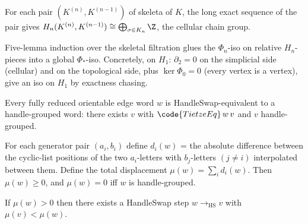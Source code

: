 \begin{lemma}
\label{lem:r3subB-A-r2}
For each pair \((K^{(n)},K^{(n-1)})\) of skeleta of \(K\),
the long exact sequence of the pair gives
\(H_{n}(K^{(n)},K^{(n-1)})\cong\bigoplus_{\sigma\in K_{n}}\Z\),
the cellular chain group.
\leanok
\end{lemma}

\begin{lemma}
\label{lem:r3subB-A-r3}
Five-lemma induction over the skeletal filtration glues the
\(\Phi_{n}\)-iso on relative \(H_{n}\)-pieces into a global
\(\Phi_{*}\)-iso.  Concretely, on \(H_{1}\): \(\partial_{2}=0\) on
the simplicial side (cellular) and on the topological side, plus
\(\ker\Phi_{0}=0\) (every vertex is a vertex), give an iso on
\(H_{1}\) by exactness chasing.
\leanok
\end{lemma}

\begin{lemma}
\label{lem:r3subB-handle-pairing}
Every fully reduced orientable edge word \(w\) is HandleSwap-equivalent
to a handle-grouped word: there exists \(v\) with
\(\code{TietzeEq}\,w\,v\) and \(v\) handle-grouped.
\leanok
\end{lemma}

\begin{lemma}
\label{lem:r3subB-B-r1}
For each generator pair \((a_{i},b_{i})\) define
\(d_{i}(w)\) = the absolute difference between the cyclic-list
positions of the two \(a_{i}\)-letters with \(b_{j}\)-letters
\((j\neq i)\) interpolated between them.  Define the total
displacement \(\mu(w)=\sum_{i}d_{i}(w)\).  Then \(\mu(w)\geq 0\),
and \(\mu(w)=0\) iff \(w\) is handle-grouped.
\leanok
\end{lemma}

\begin{lemma}
\label{lem:r3subB-B-r2}
If \(\mu(w)>0\) then there exists a HandleSwap step
\(w\to_{\mathrm{HS}} v\) with \(\mu(v)<\mu(w)\).
\leanok
\end{lemma}

